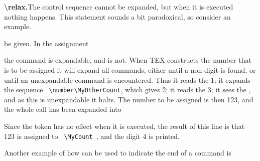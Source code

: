 
\begin{teX}
{ \xdef\foo{\string\}}}
\end{teX}

\begin{multicols}{2}
\textbf{\textbackslash relax.}\quad The control sequence  cannot be expanded, but when it is executed nothing happens.
This statement sounds a bit paradoxical, so consider an example. 


\begin{teX}
\newcount\MyCount
\newcount\MyOtherCount {}
be given. In the assignment
\number{}
\end{teX}



\end{multicols}

\begin{multicols}{2}
the command  is expandable, and  is not. When TEX constructs the number that is
to be assigned it will expand all commands, either until a non-digit is found, or until an unexpandable
command is encountered. Thus it reads the 1; it expands the sequence \verb+ \number\MyOtherCount+,
which gives 2; it reads the 3; it sees the , and as this is unexpandable it halts. The number
to be assigned is then 123, and the whole call has been expanded into


\noindent Since the  token has no effect when it is executed, the result of this line is that 123 is
assigned to \verb+ \MyCount +, and the digit 4 is printed.



Another example of how  can be used to indicate the end of a command is

\end{multicols}


